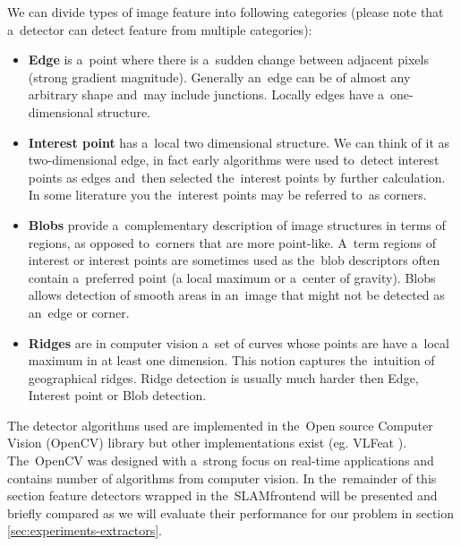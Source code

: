 We can divide types of image feature into following categories (please note that a~detector can detect feature from multiple categories):
\begin{itemize}
	\item \textbf{Edge} is a~point where there is a~sudden change between adjacent pixels (strong gradient magnitude). Generally an~edge can be of almost any arbitrary shape and~may include junctions. Locally edges have a~one-dimensional structure.
	\item \textbf{Interest point} has a~local two dimensional structure. We can think of it as two-dimensional edge, in fact early algorithms were used to~detect interest points as edges and~then selected the~interest points by further calculation. In some literature you the~interest points may be referred to~as corners.
	\item \textbf{Blobs} provide a~complementary description of image structures in terms of regions, as opposed to~corners that are more point-like. A~term regions of interest or interest points are sometimes used as the~blob descriptors often contain a~preferred point (a local maximum or a~center of gravity). Blobs allows detection of smooth areas in an~image that might not be detected as an~edge or corner.
	\item \textbf{Ridges} are in computer vision a~set of curves whose points are have a~local maximum in at least one dimension. This notion captures the~intuition of geographical ridges. Ridge detection is usually much harder then Edge, Interest point or Blob detection.
\end{itemize}

The detector algorithms used are implemented in the~Open source Computer Vision (OpenCV) \cite{www:opencv} library but other implementations exist (eg. VLFeat \cite{vlfeat}). The~OpenCV was designed with a~strong focus on real-time applications and contains number of algorithms from computer vision. In the~remainder of this section feature detectors wrapped in the~SLAM\textunderscore frontend will be presented and briefly compared as we will evaluate their performance for our problem in section \ref{sec:experiments-extractors}.

